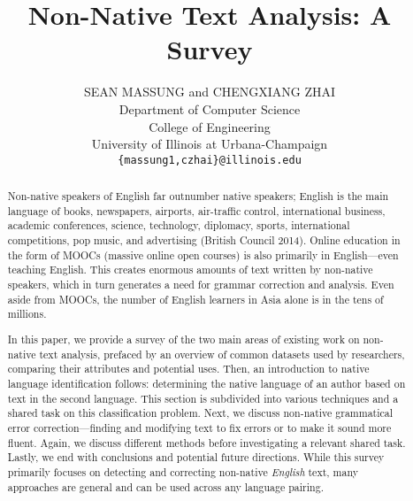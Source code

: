 \documentclass{nle}
\title{Non-Native Text Analysis: A Survey}
\author[Sean Massung and ChengXiang Zhai]{SEAN MASSUNG and CHENGXIANG ZHAI \\
    Department of Computer Science \\
College of Engineering \\ University of Illinois at Urbana-Champaign \\
\texttt{\{massung1,czhai\}@illinois.edu}}
\begin{document}
\label{firstpage}
\maketitle

\begin{abstract}
Non-native speakers of English far outnumber native speakers; English is the
main language of books, newspapers, airports, air-traffic control, international
business, academic conferences, science, technology, diplomacy, sports,
international competitions, pop music, and advertising (British Council 2014).
Online education in the form of MOOCs (massive online open courses) is also
primarily in English---even teaching English. This creates enormous amounts of
text written by non-native speakers, which in turn generates a need for grammar
correction and analysis. Even aside from MOOCs, the number of English learners
in Asia alone is in the tens of millions.

In this paper, we provide a survey of the two main areas of existing work on
non-native text analysis, prefaced by an overview of common datasets used by
researchers, comparing their attributes and potential uses. Then, an
introduction to native language identification follows: determining the native
language of an author based on text in the second language. This section is
subdivided into various techniques and a shared task on this classification
problem. Next, we discuss non-native grammatical error correction---finding and
modifying text to fix errors or to make it sound more fluent. Again, we discuss
different methods before investigating a relevant shared task. Lastly, we end
with conclusions and potential future directions. While this survey primarily
focuses on detecting and correcting non-native \emph{English} text, many
approaches are general and can be used across any language pairing.
\end{abstract}







\begin{thebibliography}{}
    
\end{thebibliography}
\label{lastpage}
\end{document}
